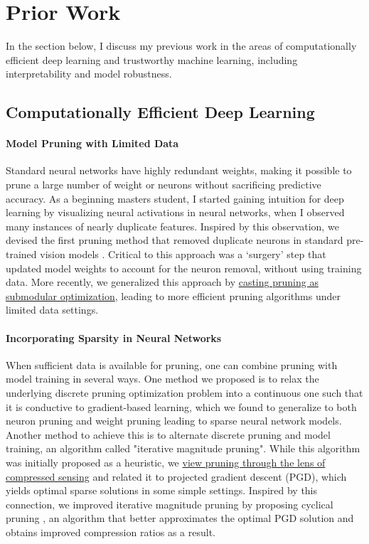 \documentclass{article}
\renewcommand{\cite}{\citep}
\begin{document}
\section*{Prior Work}

In the section below, I discuss my previous work in the areas of computationally efficient deep learning and trustworthy machine learning, including interpretability and model robustness. 

\subsection*{Computationally Efficient Deep Learning}
\paragraph{Model Pruning with Limited Data} Standard neural networks have highly redundant weights, making it possible to prune a large number of weight or neurons without sacrificing predictive accuracy. As a beginning masters student, I started gaining intuition for deep learning by visualizing neural activations in neural networks, when I observed many instances of nearly duplicate features. Inspired by this observation, we devised the first pruning method that removed duplicate neurons in standard pre-trained vision models \cite{srinivas2015data}. Critical to this approach was a `surgery' step that updated model weights to account for the neuron removal, without using training data. More recently, we generalized this approach \cite{halabi2022dataefficient} by \underline{casting pruning as submodular optimization}, leading to more efficient pruning algorithms under limited data settings.

\paragraph{Incorporating Sparsity in Neural Networks} When sufficient data is available for pruning, one can combine pruning with model training in several ways. One method we proposed is to relax the underlying discrete pruning optimization problem into a continuous one such that it is conductive to gradient-based learning, which we found to generalize to both neuron pruning \cite{srinivas2016learning} and weight pruning \cite{srinivas2017training} leading to sparse neural network models. Another method to achieve this is to alternate discrete pruning and model training, an algorithm called "iterative magnitude pruning". While this algorithm was initially proposed as a heuristic, we \underline{view pruning through the lens of compressed sensing} and related it to projected gradient descent (PGD), which yields optimal sparse solutions in some simple settings. Inspired by this connection, we improved iterative magnitude pruning by proposing cyclical pruning \cite{srinivas2022cyclical}, an algorithm that better approximates the optimal PGD solution and obtains improved compression ratios as a result.
\end{document}
